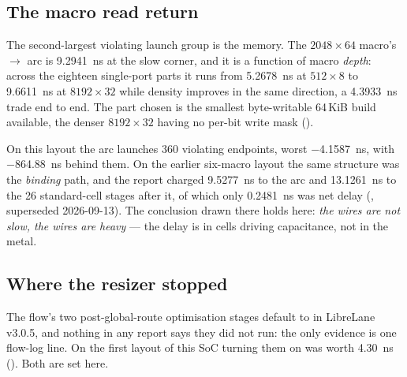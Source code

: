 \subsection{The macro read return}

The second-largest violating launch group is the memory. The
$2048\times64$ macro's $\rightarrow$ arc is
\qty{9.2941}{\nano\second} at the slow corner, and it is a function of
macro \emph{depth}: across the eighteen single-port parts it runs from
\qty{5.2678}{\nano\second} at $512 \times 8$ to
\qty{9.6611}{\nano\second} at $8192 \times 32$ while density improves in
the same direction, a \qty{4.3933}{\nano\second} trade end to end. The part
chosen is the smallest byte-writable 64\,KiB build available, the
denser $8192\times32$ having no per-bit write mask
().

On this layout the arc launches 360 violating endpoints, worst
\qty{-4.1587}{\nano\second}, with \qty{-864.88}{\nano\second} behind
them. On the earlier six-macro layout the same structure was the
\emph{binding} path, and the report charged \qty{9.5277}{\nano\second}
to the arc and \qty{13.1261}{\nano\second} to the 26 standard-cell
stages after it, of which only \qty{0.2481}{\nano\second} was net delay
(, superseded 2026-09-13). The conclusion drawn
there holds here: \emph{the wires are not slow, the wires are heavy} ---
the delay is in cells driving capacitance, not in the metal.

\subsection{Where the resizer stopped}

The flow's two post-global-route optimisation stages default to
 in LibreLane v3.0.5, and nothing in any report says they
did not run: the only evidence is one flow-log line. On the first layout
of this SoC turning them on was worth \qty{4.30}{\nano\second}
(). Both are set here.

